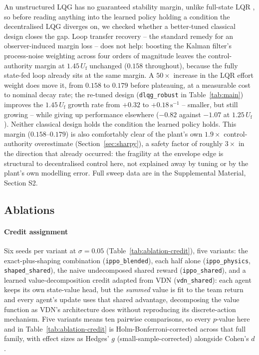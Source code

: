 \documentclass[journal]{new-aiaa}
\newcommand{\Uf}{U_{\mathrm{f}}}
\begin{document}
An unstructured LQG has no guaranteed stability margin, unlike full-state
LQR \cite{doyle1978guaranteed}, so before reading anything into the learned
policy holding a condition the decentralised LQG diverges on, we checked
whether a better-tuned classical design closes the gap. Loop transfer
recovery \cite{doylestein1981ltr} -- the standard remedy for an
observer-induced margin loss -- does not help: boosting the Kalman
filter's process-noise weighting across four orders of magnitude leaves the
control-authority margin at $1.45\,\Uf$ unchanged ($0.158$ throughout),
because the fully state-fed loop already sits at the same margin. A
$50\times$ increase in the LQR effort weight does move it, from $0.158$ to
$0.179$ before plateauing, at a measurable cost to nominal decay rate; the
re-tuned design (\texttt{dlqg\_robust} in Table~\ref{tab:main}) improves the
$1.45\,\Uf$ growth rate from $+0.32$ to $+0.18\,\mathrm{s}^{-1}$ -- smaller,
but still growing -- while giving up performance elsewhere ($-0.82$ against
$-1.07$ at $1.25\,\Uf$). Neither classical design holds the condition the
learned policy holds. This margin ($0.158$--$0.179$) is also comfortably
clear of the plant's own $1.9\times$ control-authority overestimate
(Section~\ref{sec:sharpy}), a safety factor of roughly $3\times$ in the
direction that already occurred: the fragility at the envelope edge is
structural to decentralised control here, not explained away by tuning or
by the plant's own modelling error. Full sweep data are in the Supplemental
Material, Section S2.

\subsection{Ablations}
\label{sec:ablations}

\paragraph{Credit assignment}
Six seeds per variant at $\sigma=0.05$ (Table~\ref{tab:ablation-credit}),
five variants: the exact-plus-shaping combination
(\texttt{ippo\_blended}), each half alone (\texttt{ippo\_physics},
\texttt{shaped\_shared}), the naive undecomposed shared reward
(\texttt{ippo\_shared}), and a learned value-decomposition credit adapted
from VDN \cite{sunehag2018vdn} (\texttt{vdn\_shared}): each agent keeps its
own state-value head, but the \emph{summed} value is fit to the team return
and every agent's update uses that shared advantage, decomposing the value
function as VDN's architecture does without reproducing its discrete-action
mechanism. Five variants means ten pairwise comparisons, so every $p$-value
here and in Table~\ref{tab:ablation-credit} is Holm-Bonferroni-corrected
across that full family, with effect sizes as Hedges' $g$
(small-sample-corrected) alongside Cohen's $d$.
\end{document}
